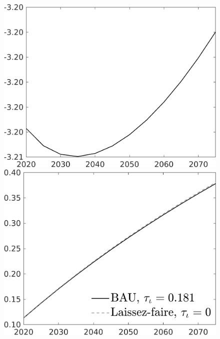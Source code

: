 \documentclass[12pt]{article}
\begin{document}
\begin{figure}[h!!]
\begin{minipage}[]{0.32\textwidth}
	\end{minipage}	
	\begin{minipage}[]{0.32\textwidth}
		\includegraphics[width=1\textwidth]{../../codding_model/own_basedOnFried/optimalPol_010922_revision/figures/all_13Sept22/CompTaul_Equlab_LFBAUPer_Reg0_wl_spillover0_nsk0_xgr0_knspil0_sep1_countec0_GovRev0_etaa0.79.png}
	\end{minipage}	
	\begin{minipage}[]{0.32\textwidth}
		\includegraphics[width=1\textwidth]{../../codding_model/own_basedOnFried/optimalPol_010922_revision/figures/all_13Sept22/CompTaul_Equlab_LFBAU_Reg0_GFF_spillover0_nsk0_xgr0_knspil0_sep1_countec0_GovRev0_etaa0.79_lgd1.png}

\end{minipage}
\end{figure}
\end{document}
